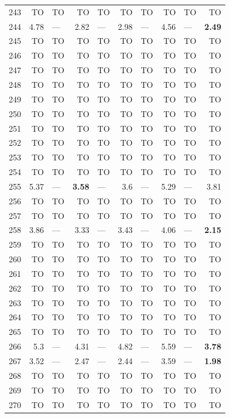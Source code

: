 \begin{longtable}{lr@{\hskip 4pt}l@{\hskip 12pt}r@{\hskip 4pt}l@{\hskip 12pt}r@{\hskip 4pt}l@{\hskip 12pt}r@{\hskip 4pt}l@{\hskip 12pt}r}
243 & TO & TO & TO & TO & TO & TO & TO & TO & TO \\
244 & 4.78 & --- & 2.82 & --- & 2.98 & --- & 4.56 & --- & \textbf{2.49} \\
245 & TO & TO & TO & TO & TO & TO & TO & TO & TO \\
246 & TO & TO & TO & TO & TO & TO & TO & TO & TO \\
247 & TO & TO & TO & TO & TO & TO & TO & TO & TO \\
248 & TO & TO & TO & TO & TO & TO & TO & TO & TO \\
249 & TO & TO & TO & TO & TO & TO & TO & TO & TO \\
250 & TO & TO & TO & TO & TO & TO & TO & TO & TO \\
251 & TO & TO & TO & TO & TO & TO & TO & TO & TO \\
252 & TO & TO & TO & TO & TO & TO & TO & TO & TO \\
253 & TO & TO & TO & TO & TO & TO & TO & TO & TO \\
254 & TO & TO & TO & TO & TO & TO & TO & TO & TO \\
255 & 5.37 & --- & \textbf{3.58} & --- & 3.6 & --- & 5.29 & --- & 3.81 \\
256 & TO & TO & TO & TO & TO & TO & TO & TO & TO \\
257 & TO & TO & TO & TO & TO & TO & TO & TO & TO \\
258 & 3.86 & --- & 3.33 & --- & 3.43 & --- & 4.06 & --- & \textbf{2.15} \\
259 & TO & TO & TO & TO & TO & TO & TO & TO & TO \\
260 & TO & TO & TO & TO & TO & TO & TO & TO & TO \\
261 & TO & TO & TO & TO & TO & TO & TO & TO & TO \\
262 & TO & TO & TO & TO & TO & TO & TO & TO & TO \\
263 & TO & TO & TO & TO & TO & TO & TO & TO & TO \\
264 & TO & TO & TO & TO & TO & TO & TO & TO & TO \\
265 & TO & TO & TO & TO & TO & TO & TO & TO & TO \\
266 & 5.3 & --- & 4.31 & --- & 4.82 & --- & 5.59 & --- & \textbf{3.78} \\
267 & 3.52 & --- & 2.47 & --- & 2.44 & --- & 3.59 & --- & \textbf{1.98} \\
268 & TO & TO & TO & TO & TO & TO & TO & TO & TO \\
269 & TO & TO & TO & TO & TO & TO & TO & TO & TO \\
270 & TO & TO & TO & TO & TO & TO & TO & TO & TO \\

\end{longtable}

